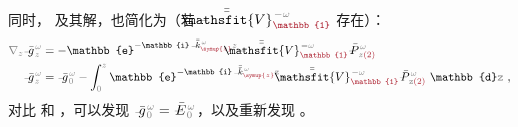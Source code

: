 同时， 及其解，也简化为（若 $\Xint{\mathcolor{gray}{-}}{25}{\bar{\bar{\mathsfit{V}}}}^{\;\! - \mathcolor{gray}{\omega}}_{\textcolor{Maroon}{\mathbb{1}}}$ 存在）：
\begin{subequations} \label{eq:simplify6-LE0-SVA-E'-V_1nonsingular-gg}
\begin{align}
	\mathcolor{gray}{\nabla_z} \Xint{{}^{}_{\mathcolor{gray}{-}}}{10}{\bar{g}}^{\;\!\mathcolor{gray}{\omega}}_{\;\! \mathcolor{gray}{z}}
	&= - \mathbb{e}^{-\mathbb{i} \Xint{\begin{smallmatrix} ~ \\ {}^{}_{\mathcolor{gray}{-}} \\ ~ \end{smallmatrix}}{15}{\bar{\bar{k}}}_{\textcolor{Maroon}{\symup{z}}}^{\;\! \mathcolor{gray}{\omega}} \mathcolor{gray}{z}} \Xint{\mathcolor{gray}{-}}{25}{\bar{\bar{\mathsfit{V}}}}^{\;\! - \mathcolor{gray}{\omega}}_{\textcolor{Maroon}{\mathbb{1}}} \Xint{\mathcolor{gray}{-}}{30}{\bar{P}}^{\;\! \mathcolor{gray}{\omega}}_{\;\! \mathcolor{gray}{z} \textcolor{Maroon}{(2)}} \label{eq:simplify6-LE0-SVA-E'-V_1nonsingular-g} \\
	\Xint{{}^{}_{\mathcolor{gray}{-}}}{10}{\bar{g}}^{\;\!\mathcolor{gray}{\omega}}_{\;\! \mathcolor{gray}{z}}
	&= \Xint{{}^{}_{\mathcolor{gray}{-}}}{10}{\bar{g}}^{\;\!\mathcolor{gray}{\omega}}_{\;\! \mathcolor{gray}{0}} - \int_{\mathcolor{gray}{0}}^{\mathcolor{gray}{z}} \mathbb{e}^{- \mathbb{i} \Xint{\begin{smallmatrix} ~ \\ {}^{}_{\mathcolor{gray}{-}} \\ ~ \end{smallmatrix}}{15}{\bar{\bar{k}}}_{\textcolor{Maroon}{\symup{z}}}^{\;\! \mathcolor{gray}{\omega}} \mathcolor{gray}{\mathtt{z}}} \cdot \Xint{\mathcolor{gray}{-}}{25}{\bar{\bar{\mathsfit{V}}}}^{\;\! - \mathcolor{gray}{\omega}}_{\textcolor{Maroon}{\mathbb{1}}} \Xint{\mathcolor{gray}{-}}{30}{\bar{P}}^{\;\! \mathcolor{gray}{\omega}}_{\;\! \mathcolor{gray}{\mathtt{z}} \textcolor{Maroon}{(2)}} ~\mathbb{d} \mathcolor{gray}{\mathtt{z}} ~,  \label{eq:simplify6-LE0-SVA-E'-V_1nonsingular-solution-g}
\end{align}
\end{subequations}
对比  和 ，可以发现 $\Xint{{}^{}_{\mathcolor{gray}{-}}}{10}{\bar{g}}^{\;\!\mathcolor{gray}{\omega}}_{\;\! \mathcolor{gray}{0}} = \Xint{\mathcolor{gray}{-}}{25}{\bar{E}}^{\;\!\mathcolor{gray}{\omega}}_{\;\! \mathcolor{gray}{0}}$，以及重新发现 。

